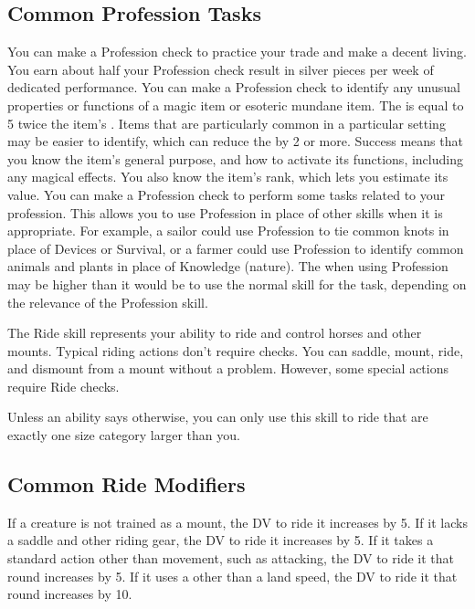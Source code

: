     \subsection{Common Profession Tasks}
         You can make a Profession check to practice your trade and make a decent living.
        You earn about half your Profession check result in silver pieces per week of dedicated performance.
         You can make a Profession check to identify any unusual properties or functions of a magic item or esoteric mundane item.
        The  is equal to 5 \add twice the item's .
        Items that are particularly common in a particular setting may be easier to identify, which can reduce the  by 2 or more.
        Success means that you know the item's general purpose, and how to activate its functions, including any magical effects.
        You also know the item's rank, which lets you estimate its value.
         You can make a Profession check to perform some tasks related to your profession.
        This allows you to use Profession in place of other skills when it is appropriate.
        For example, a sailor could use Profession to tie common knots in place of Devices or Survival, or a farmer could use Profession to identify common animals and plants in place of Knowledge (nature).
        The  when using Profession may be higher than it would be to use the normal skill for the task, depending on the relevance of the Profession skill.

\newpage
{}
    The Ride skill represents your ability to ride and control horses and other mounts.
    Typical riding actions don't require checks. You can saddle, mount, ride, and dismount from a mount without a problem. However, some special actions require Ride checks.

    Unless an ability says otherwise, you can only use this skill to ride  that are exactly one size category larger than you.

    \subsection{Common Ride Modifiers}
        If a creature is not trained as a mount, the DV to ride it increases by 5.
        If it lacks a saddle and other riding gear, the DV to ride it increases by 5.
        If it takes a standard action other than movement, such as attacking, the DV to ride it that round increases by 5.
        If it uses a  other than a land speed, the DV to ride it that round increases by 10.


